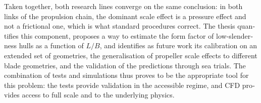 \begin{otherlanguage}{english}
\begin{ResumenPlantilla}
Taken together, both research lines converge on the same conclusion: in both
links of the propulsion chain, the dominant scale effect is a pressure effect and
not a frictional one, which is what standard procedures correct. The thesis
quantifies this component, proposes a way to estimate the form factor of
low-slenderness hulls as a function of $L/B$, and identifies as future work its
calibration on an extended set of geometries, the generalisation of propeller
scale effects to different blade geometries, and the validation of the
predictions through sea trials. The combination of tests and simulations thus
proves to be the appropriate tool for this problem: the tests provide validation
in the accessible regime, and CFD provides access to full scale and to the
underlying physics.
\end{ResumenPlantilla}
\end{otherlanguage}

\clearpage
\begin{DatosPlantilla}

\end{DatosPlantilla}